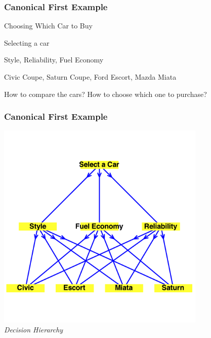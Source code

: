 \documentclass[10pt,handout,hyperref={colorlinks=true,linkcolor=blue,citecolor=citelink,urlcolor=gray}]{beamer}
\newcounter{e_temp}
\begin{document}
\begin{frame}[label=firsteg]
\frametitle{Canonical First Example}
\begin{block}{Choosing Which Car to Buy}
\begin{description}
\setlength{\itemsep}{2ex}
\item[Objective] Selecting a car
\item[Criteria] Style, Reliability, Fuel Economy
\item[Alternatives] Civic Coupe, Saturn Coupe, Ford Escort, Mazda Miata \\[2ex]
\end{description}
\pause

\centerline{How to compare the cars? How to choose which one to purchase?}
\end{block}
\end{frame}

\begin{frame}[label=TheCarGraph]
\frametitle{Canonical First Example}
\begin{center}
\includegraphics[width=0.75\textwidth]{TheCarGraph} \\[1ex]

\emph{Decision Hierarchy}
\end{center}
\end{frame}
\end{document}
